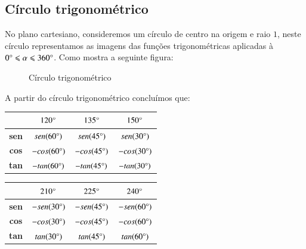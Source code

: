 \subsection{Círculo trigonométrico}

 No plano cartesiano, consideremos um círculo de centro na origem e raio $1$, neste círculo representamos as imagens das funções trigonométricas aplicadas à  $0 \degree \leqslant \alpha \leqslant 360 \degree$. Como mostra a seguinte figura:
 \begin{figure}[H]
   \centering
   \caption{Círculo trigonométrico}
  \end{figure}

  A partir do círculo trigonométrico concluímos que:

  \begin{table}[H]
 \centering
 \begin{tabular}{|c|c|c|c|} \hline
 \rowcolor{cinza}
               &  $120\degree$  & $135\degree$  &  $150\degree$ \\\hline
  \textbf{sen} & $sen(60\degree)$ &$sen(45\degree)$ & $sen(30\degree)$  \\\hline
  \textbf{cos} & $-cos(60\degree)$ &$-cos(45\degree)$ & $-cos(30\degree)$  \\\hline
  \textbf{tan} & $-tan(60\degree)$ &$-tan(45\degree)$ & $-tan(30\degree)$  \\\hline
 \end{tabular}
\end{table}

 \begin{table}[H]
 \centering
 \begin{tabular}{|c|c|c|c|} \hline
 \rowcolor{cinza}
                & $210\degree$ & $225\degree$  & $240\degree$  \\\hline
  \textbf{sen} &  $-sen(30\degree)$ & $-sen(45\degree)$ & $-sen(60\degree)$  \\\hline
  \textbf{cos} &  $-cos(30\degree)$ & $-cos(45\degree)$ & $-cos(60\degree)$  \\\hline
  \textbf{tan} &  $tan(30\degree)$ & $tan(45\degree)$ & $tan(60\degree)$   \\\hline
 \end{tabular}
\end{table}

